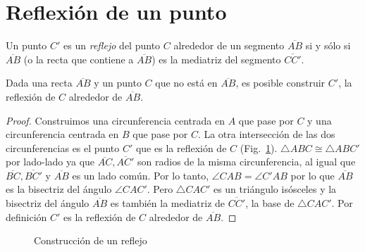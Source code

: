
\section{Reflexión de un punto}\label{s.reflection}

\begin{definition}
Un punto $C'$ es un \emph{reflejo} del punto $C$ alrededor de un segmento $\overline{AB}$ si y sólo si $\overline{AB}$ (o la recta que contiene a $\overline{AB}$) es la mediatriz del segmento $\overline{CC'}$.
\end{definition}

\begin{theorem}\label{thm.compass-reflection}
Dada una recta $\overline{AB}$ y un punto $C$ que no está en $\overline{AB}$, es posible construir $C'$, la reflexión de $C$ alrededor de $\overline{AB}$.
\end{theorem}

\begin{proof} 
Construimos una circunferencia centrada en $A$ que pase por $C$ y una circunferencia centrada en $B$ que pase por $C$. La otra intersección de las dos circunferencias es el punto $C'$ que es la reflexión de $C$ (Fig.~\ref{f.compass-reflection}).
$\triangle ABC \cong \triangle ABC'$ por lado-lado ya que $\overline{AC}, \overline{AC'}$ son radios de la misma circunferencia, al igual que $\overline{BC}, \overline{BC'}$ y $\overline{AB}$ es un lado común. Por lo tanto, $\angle CAB = \angle C'AB$ por lo que $\overline{AB}$ es la bisectriz del ángulo $\angle CAC'$. Pero $\triangle CAC'$ es un triángulo isósceles y la bisectriz del ángulo $\overline{AB}$ es también la mediatriz de $\overline{CC'}$, la base de $\triangle CAC'$. Por definición $C'$ es la reflexión de $C$ alrededor de $\overline{AB}$.
\end{proof}

\begin{figure}[t]
\begin{center}
\end{center}
\caption{Construcción de un reflejo}\label{f.compass-reflection}
\end{figure}

